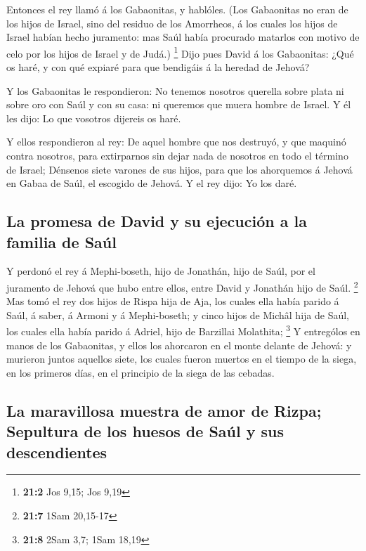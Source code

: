  Entonces el rey llamó á los Gabaonitas, y hablóles. (Los
Gabaonitas no eran de los hijos de Israel, sino del residuo de los
Amorrheos, á los cuales los hijos de Israel habían hecho juramento: mas
Saúl había procurado matarlos con motivo de celo por los hijos de Israel
y de Judá.) \footnote{\textbf{21:2} Jos 9,15; Jos 9,19} 
Dijo pues David á los Gabaonitas: ¿Qué os haré, y con qué expiaré para
que bendigáis á la heredad de Jehová?

 Y los Gabaonitas le respondieron: No tenemos nosotros
querella sobre plata ni sobre oro con Saúl y con su casa: ni queremos
que muera hombre de Israel. Y él les dijo: Lo que vosotros dijereis os
haré.

 Y ellos respondieron al rey: De aquel hombre que nos
destruyó, y que maquinó contra nosotros, para extirparnos sin dejar nada
de nosotros en todo el término de Israel;  Dénsenos siete
varones de sus hijos, para que los ahorquemos á Jehová en Gabaa de Saúl,
el escogido de Jehová. Y el rey dijo: Yo los daré.

\hypertarget{la-promesa-de-david-y-su-ejecuciuxf3n-a-la-familia-de-sauxfal}{%
\subsection{La promesa de David y su ejecución a la familia de
Saúl}\label{la-promesa-de-david-y-su-ejecuciuxf3n-a-la-familia-de-sauxfal}}

 Y perdonó el rey á Mephi-boseth, hijo de Jonathán, hijo
de Saúl, por el juramento de Jehová que hubo entre ellos, entre David y
Jonathán hijo de Saúl. \footnote{\textbf{21:7} 1Sam 20,15-17}
 Mas tomó el rey dos hijos de Rispa hija de Aja, los
cuales ella había parido á Saúl, á saber, á Armoni y á Mephi-boseth; y
cinco hijos de Michâl hija de Saúl, los cuales ella había parido á
Adriel, hijo de Barzillai Molathita; \footnote{\textbf{21:8} 2Sam 3,7;
  1Sam 18,19}  Y entrególos en manos de los Gabaonitas, y
ellos los ahorcaron en el monte delante de Jehová: y murieron juntos
aquellos siete, los cuales fueron muertos en el tiempo de la siega, en
los primeros días, en el principio de la siega de las cebadas.

\hypertarget{la-maravillosa-muestra-de-amor-de-rizpa-sepultura-de-los-huesos-de-sauxfal-y-sus-descendientes}{%
\subsection{La maravillosa muestra de amor de Rizpa; Sepultura de los
huesos de Saúl y sus
descendientes}\label{la-maravillosa-muestra-de-amor-de-rizpa-sepultura-de-los-huesos-de-sauxfal-y-sus-descendientes}}

